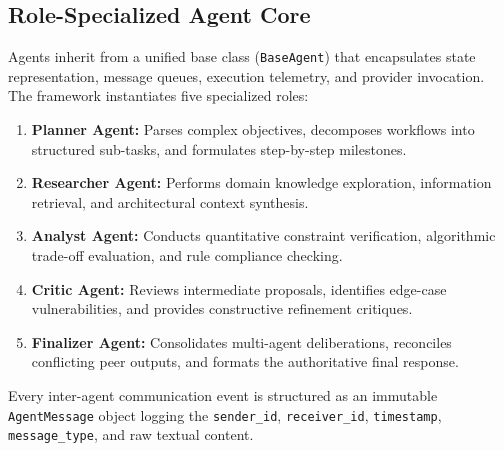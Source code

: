 \subsection{Role-Specialized Agent Core}
Agents inherit from a unified base class (\texttt{BaseAgent}) that encapsulates state representation, message queues, execution telemetry, and provider invocation. The framework instantiates five specialized roles:
\begin{enumerate}
    \item \textbf{Planner Agent:} Parses complex objectives, decomposes workflows into structured sub-tasks, and formulates step-by-step milestones.
    \item \textbf{Researcher Agent:} Performs domain knowledge exploration, information retrieval, and architectural context synthesis.
    \item \textbf{Analyst Agent:} Conducts quantitative constraint verification, algorithmic trade-off evaluation, and rule compliance checking.
    \item \textbf{Critic Agent:} Reviews intermediate proposals, identifies edge-case vulnerabilities, and provides constructive refinement critiques.
    \item \textbf{Finalizer Agent:} Consolidates multi-agent deliberations, reconciles conflicting peer outputs, and formats the authoritative final response.
\end{enumerate}

Every inter-agent communication event is structured as an immutable \texttt{AgentMessage} object logging the \texttt{sender\_id}, \texttt{receiver\_id}, \texttt{timestamp}, \texttt{message\_type}, and raw textual content.

